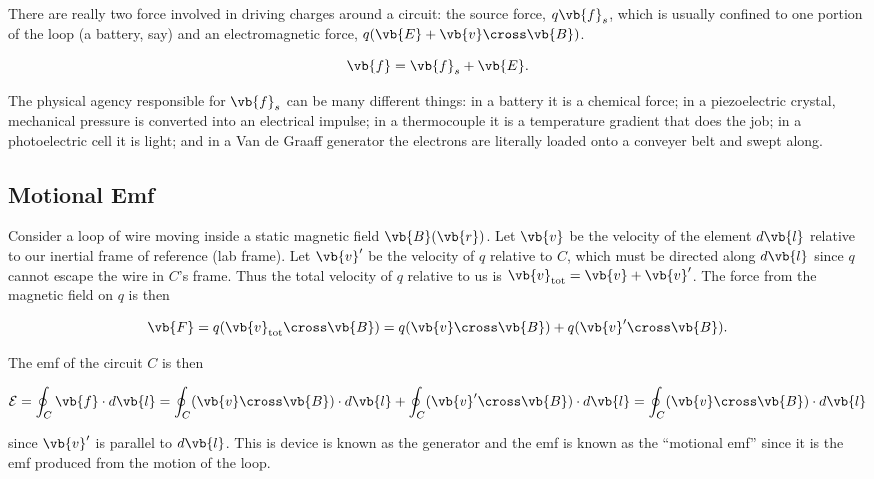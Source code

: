 \documentclass[english,a4paper,12pt]{report}
\begin{document}
There are really two force involved in driving charges around a circuit: the source force, \(q \vb{f} _{s}  \), which is usually confined to one portion of the loop (a battery, say) and an electromagnetic force, \(q(\vb{E} + \vb{v} \cross \vb{B} ) \).

\begin{equation}
    \vb{f} = \vb{f} _{s} + \vb{E} . 
\end{equation}

The physical agency responsible for \(\vb{f} _{s} \)  can be many different things: in a battery it is a chemical force; in a piezoelectric crystal, mechanical pressure is converted into an electrical impulse; in a thermocouple it is a temperature gradient that does the job; in a photoelectric cell it is light; and in a Van de Graaff generator the electrons are literally loaded onto a conveyer belt and swept along. 

\subsection{Motional Emf}
Consider a loop of wire moving inside a static magnetic field \(\vb{B} (\vb{r} )\). Let \(\vb{v} \) be the velocity of the element \(d \vb{l} \) relative to our inertial frame of reference (lab frame). Let \(\vb{v} '\) be the velocity of \(q\) relative to \(C\), which must be directed along \(d \vb{l} \) since \(q\) cannot escape the wire in \(C\)'s frame. Thus the total velocity of \(q\) relative to us is \(\vb{v} _{\text{tot} } = \vb{v} + \vb{v} ' \). The force from the magnetic field on \(q\) is then

\begin{equation}
    \vb{F} = q(\vb{v} _{\text{tot} } \cross \vb{B} ) = q (\vb{v} \cross \vb{B} ) + q (\vb{v} ' \cross \vb{B} ).
\end{equation}

The emf of the circuit \(C\) is then 

\begin{equation}
    \mathcal{E} = \oint_{C} \vb{f} \cdot d \vb{l} = \oint_{C} (\vb{v} \cross \vb{B} ) \cdot d \vb{l}  + \oint_{C} (\vb{v} ' \cross \vb{B} ) \cdot d \vb{l} = \oint_{C} (\vb{v} \cross \vb{B} ) \cdot d \vb{l} 
\end{equation}

since \(\vb{v} '\) is parallel to \(d \vb{l} \). This is device is known as the generator and the emf is known as the ``motional emf'' since it is the emf produced from the motion of the loop.
\end{document}
